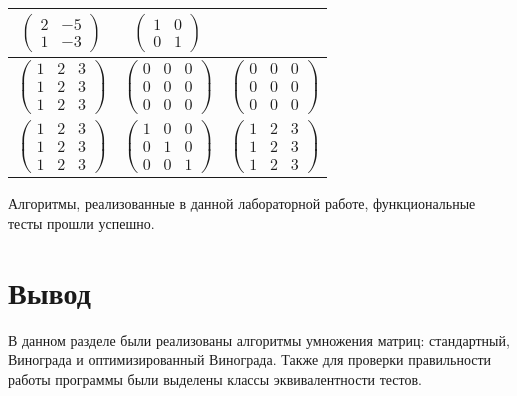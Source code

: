\begin{table}[h!]
\begin{center}
\begin{tabular}{|c|c|c|}
			$\begin{pmatrix}
                2 & -5\\
                1 & -3
			\end{pmatrix}$ &
			$\begin{pmatrix}
			    1 & 0\\
                0 & 1
			\end{pmatrix}$ \\
            \hline
			$\begin{pmatrix}
                1 & 2 & 3\\
                1 & 2 & 3\\
                1 & 2 & 3
			\end{pmatrix}$ &
			$\begin{pmatrix}
                0 & 0 & 0\\
                0 & 0 & 0\\
                0 & 0 & 0
			\end{pmatrix}$ &
			$\begin{pmatrix}
                0 & 0 & 0\\
                0 & 0 & 0\\
                0 & 0 & 0
			\end{pmatrix}$ \\
            \hline
			$\begin{pmatrix}
                1 & 2 & 3\\
                1 & 2 & 3\\
                1 & 2 & 3
			\end{pmatrix}$ &
			$\begin{pmatrix}
                1 & 0 & 0\\
                0 & 1 & 0\\
                0 & 0 & 1
			\end{pmatrix}$ &
			$\begin{pmatrix}
                1 & 2 & 3\\
                1 & 2 & 3\\
                1 & 2 & 3
            \end{pmatrix}$ \\
            \hline
		\end{tabular}
	\end{center}
\end{table}

Алгоритмы, реализованные в данной лабораторной работе, функциональные тесты прошли успешно.


\section{Вывод}

В данном разделе были реализованы алгоритмы умножения матриц: стандартный, 
Винограда и оптимизированный Винограда. Также для проверки правильности работы программы были выделены классы эквивалентности тестов.
